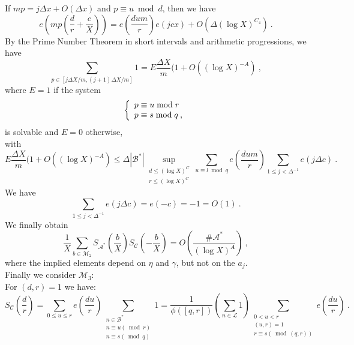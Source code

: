\documentclass{amsart}
\numberwithin{equation}{subsection}
\begin{document}
If $mp= j\Delta x+O(\Delta x)$ and $p\equiv u \bmod d$, then we have
$$e\left(mp\left(\frac{d}{r}+\frac{c}{X}\right)\right)=e\left(\frac{dum}{r}\right) e(jcx)+O(\Delta (\log X)^{C_4})\:.$$
By the Prime Number Theorem in short intervals and arithmetic progressions, we have
$$\sum_{p\in [j\Delta X/m, (j+1)\Delta X/m]}1= E\frac{\Delta X}{m}(1+O((\log X)^{-A})\:,$$
where $E=1$ if the system
\begin{eqnarray}
\left\{ 
  \begin{array}{l l}
   p\equiv u \bmod r \\ 
   p\equiv s \bmod q\:,\\
  \end{array} \right.
\nonumber
\end{eqnarray}
is solvable and $E=0$ otherwise,\\
with 
$$E\frac{\Delta X}{m}(1+O((\log X)^{-A})\leq \Delta |\mathcal{B}^*|\sup_{\substack{d\leq (\log X)^C \\ r\leq (\log X)^C}} \sum_{u \equiv l\bmod q}e\left(\frac{dum}{r}\right) \sum_{1\leq j < \Delta^{-1}} e(j\Delta c)\:. $$
We have
$$\sum_{1\leq j < \Delta^{-1}} e(j\Delta c)=e(-c)=-1=O(1)\:.$$
We finally obtain
$$\frac{1}{X}\sum_{b\in \mathcal{M}_2} S_{\mathcal{A}^*}\left(\frac{b}{X}\right) S_{\mathcal{C}}\left(-\frac{b}{X}\right)=O\left(  \frac{\#\mathcal{A}^*}{(\log X)^A}\right)\:,$$
where the implied elements depend on $\eta$ and $\gamma$, but not on the $a_j$.\\
Finally we consider $\mathcal{M}_3$:\\
For $(d, r)=1$ we have:
$$S_{\mathcal{C}}\left(\frac{d}{r}\right)=\sum_{0\leq u\leq r} e\left(\frac{du}{r}\right) \sum_{\substack{n\in \mathcal{B}^*\\ n\equiv u (\bmod r)\\ n\equiv s (\bmod q) }} 1 =\frac{1}{\phi([q, r])}\left( \sum_{n\in\mathcal{L}} 1 \right) \sum_{\substack{0< u< r \\ (u, r)=1 \\ r\equiv s (\bmod (q, r))}} e\left(\frac{du}{r}\right)\:.$$ 
\end{document}

